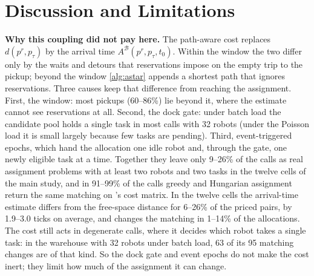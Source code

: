 \section{Discussion and Limitations}\label{sec:disc}

\noindent\textbf{Why this coupling did not pay here.}
The path-aware cost replaces $d(p^r,p_\tau)$ by the arrival time
$A^{\mathcal{B}}(p^r,p_\tau,t_0)$. Within the window the two differ only by
the waits and detours that reservations impose on the empty trip to the
pickup; beyond the window \cref{alg:astar} appends a shortest path that
ignores reservations. Three causes keep that difference from reaching the
assignment. First, the window: most pickups (60--86\%) lie beyond it, where the
estimate cannot see reservations at all. Second, the dock gate: under batch load the candidate pool holds
a single task in most calls with 32 robots (under the Poisson load it is small largely
because few tasks are pending). Third, event-triggered epochs, which hand the
allocation one idle robot and, through the gate, one newly eligible task at a time. Together they leave only 9--26\% of the
calls as real assignment problems with at least two robots and two tasks in the
twelve cells of the main study, and in 91--99\% of the calls greedy and Hungarian
assignment return the same matching on \sname's cost matrix. In the twelve cells the arrival-time estimate
differs from the free-space distance for 6--26\% of the priced pairs, by 1.9--3.0
ticks on average, and changes the matching in 1--14\% of the allocations. The
cost still acts in degenerate calls, where it decides which robot takes a single
task: in the warehouse with 32 robots under batch load, 63 of its 95 matching
changes are of that kind. So the dock gate and event epochs do not make the cost
inert; they limit how much of the assignment it can change.

